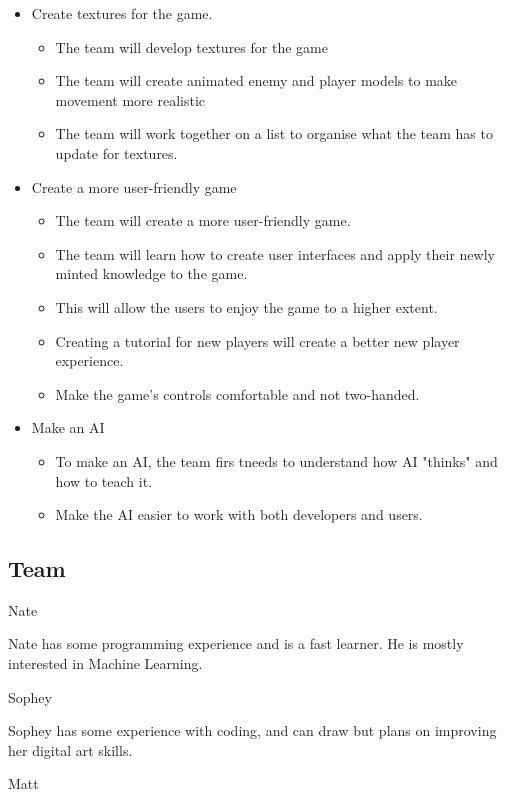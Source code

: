 \documentclass[11pt]{article}
\begin{document}
\begin{itemize}
	\item Create textures for the game.
		\begin{itemize}
			\item The team will develop textures for the game
			\item The team will create animated enemy and player models to make movement more realistic
			\item The team will work together on a list to organise what the team has to update for textures.
		\end{itemize}
	\item Create a more user-friendly game
		\begin{itemize}
			\item The team will create a more user-friendly game.
			\item The team will learn how to create user interfaces and apply their newly minted knowledge to the game.
			\item This will allow the users to enjoy the game to a higher extent.
			\item Creating a tutorial for new players will create a better new player experience.
			\item Make the game's controls comfortable and not two-handed.
		\end{itemize}
	\item Make an AI
		\begin{itemize}
			\item To make an AI, the team firs tneeds to understand how AI "thinks" and how to teach it.
			\item Make the AI easier to work with both developers and users.
		\end{itemize}
\end{itemize}

\subsection{{\color{blue}Team}}

{\large {\color{orange}Nate}}

Nate has some programming experience and is a fast learner. He is mostly interested in Machine Learning.


{\large {\color{orange}Sophey}}

Sophey has some experience with coding, and can draw but plans on improving her digital art skills.

{\large {\color{orange}Matt}}
\end{document}
